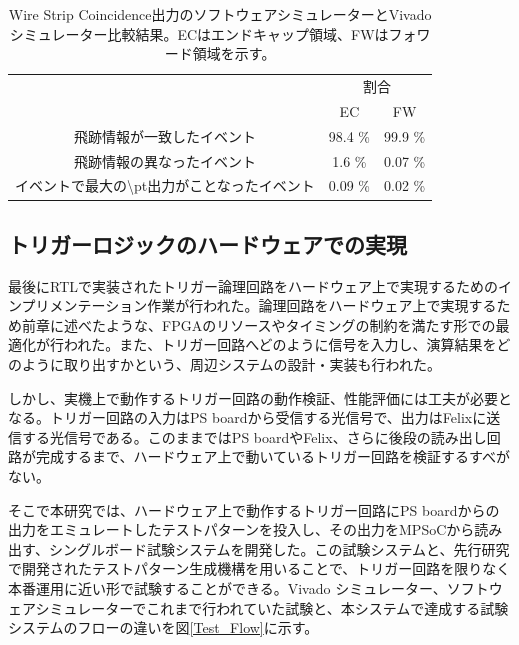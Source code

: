 \begin{table}[]
    \centering
    \caption*{Wire Strip Coincidence出力のソフトウェアシミュレーターとVivadoシミュレーター比較結果。ECはエンドキャップ領域、FWはフォワード領域を示す。\cite{mt_kawamoto}}
    \label{tab:Vivado_WS}
    \begin{tabular}{|c|cc|}
    \hline
    \multirow{2}{*}{}                      & \multicolumn{2}{c|}{割合}                \\ \cline{2-3} 
                                           & \multicolumn{1}{c|}{EC}      & FW      \\ \hline\hline
    飛跡情報が一致したイベント                          & \multicolumn{1}{c|}{98.4 \%} & 99.9 \% \\ \hline
    飛跡情報の異なったイベント                          & \multicolumn{1}{c|}{1.6 \%}  & 0.07 \% \\ \hline
    イベントで最大の\textbackslash{}pt出力がことなったイベント & \multicolumn{1}{c|}{0.09 \%} & 0.02 \% \\ \hline
    \end{tabular}
\end{table}

\subsection*{トリガーロジックのハードウェアでの実現}
最後にRTLで実装されたトリガー論理回路をハードウェア上で実現するためのインプリメンテーション作業が行われた。論理回路をハードウェア上で実現するため前章に述べたような、FPGAのリソースやタイミングの制約を満たす形での最適化が行われた。また、トリガー回路へどのように信号を入力し、演算結果をどのように取り出すかという、周辺システムの設計・実装も行われた。

しかし、実機上で動作するトリガー回路の動作検証、性能評価には工夫が必要となる。トリガー回路の入力はPS boardから受信する光信号で、出力はFelixに送信する光信号である。このままではPS boardやFelix、さらに後段の読み出し回路が完成するまで、ハードウェア上で動いているトリガー回路を検証するすべがない。

そこで本研究では、ハードウェア上で動作するトリガー回路にPS boardからの出力をエミュレートしたテストパターンを投入し、その出力をMPSoCから読み出す、シングルボード試験システムを開発した。この試験システムと、先行研究で開発されたテストパターン生成機構を用いることで、トリガー回路を限りなく本番運用に近い形で試験することができる。Vivado シミュレーター、ソフトウェアシミュレーターでこれまで行われていた試験と、本システムで達成する試験システムのフローの違いを図\ref{Test_Flow}に示す。


